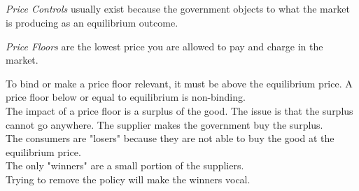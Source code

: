 \subsection{}

\begin{definition}
    \emph{Price Controls} usually exist because the government objects 
    to what the market is producing as an equilibrium outcome.
\end{definition}
\begin{definition}
    \emph{Price Floors} are the lowest price you are allowed to pay and charge in the market.
\end{definition}
To bind or make a price floor relevant, it must be above the equilibrium price.
A price floor below or equal to equilibrium is non-binding.\\
The impact of a price floor is a surplus of the good. The issue is that the surplus
cannot go anywhere. The supplier makes the government buy the surplus.\\
The consumers are "losers" because they are not able to buy the good at the equilibrium price.\\
The only "winners" are a small portion of the suppliers.\\
Trying to remove the policy will make the winners vocal.
